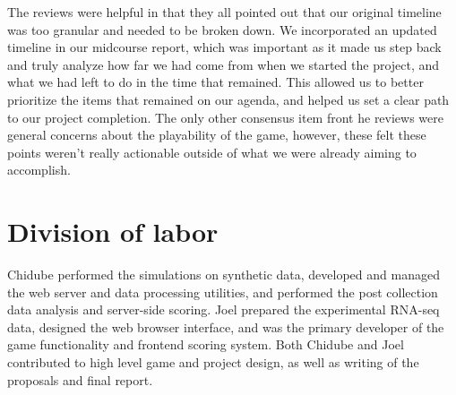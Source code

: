 \documentclass[12pt]{article}
\begin{document}
The reviews were helpful in that they all pointed out that our original timeline was too granular and needed to be broken down. We incorporated an updated timeline in our midcourse
report, which was important as it made us step back and truly analyze how far we had come from when we started the project, and what we had left to do in the time that remained. This
allowed us to better prioritize the items that remained on our agenda, and helped us set a clear path to our project completion. The only other consensus item front he reviews were general
concerns about the playability of the game, however, these felt these points weren't really actionable outside of what we were already aiming to accomplish.

\section*{Division of labor}

Chidube performed the simulations on synthetic data, developed and managed the web server and data processing utilities, and performed the post collection data analysis and server-side scoring. Joel prepared the experimental RNA-seq data, designed the web browser interface, and was the primary developer of the game functionality and frontend scoring system. Both Chidube and Joel contributed to high level game and project design, as well as writing of the proposals and final report.


\end{document}
